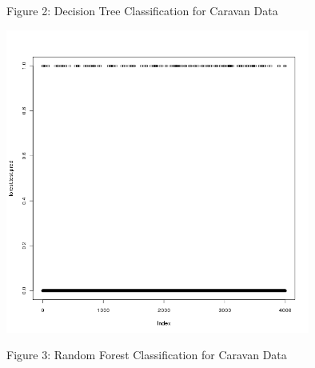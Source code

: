 \documentclass[a4paper,10pt]{article}
\begin{document}
Figure 2: Decision Tree Classification for Caravan Data


\includegraphics[width=100mm]{random_forest.png}

Figure 3: Random Forest Classification for Caravan Data
\end{document}
